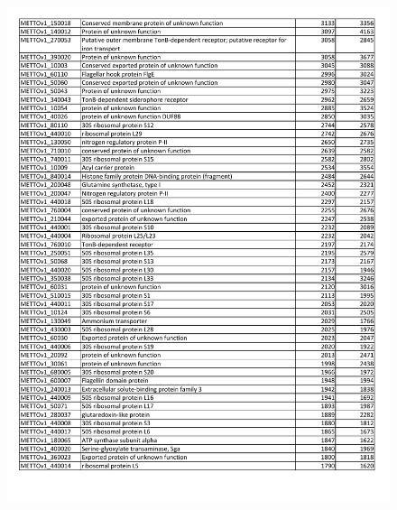 \begin{figure}[H]
\centering
    \includegraphics[width=1.0\textwidth]{./tex/chapter1/figures/supplemental/TableS2b.pdf}
\end{figure}

